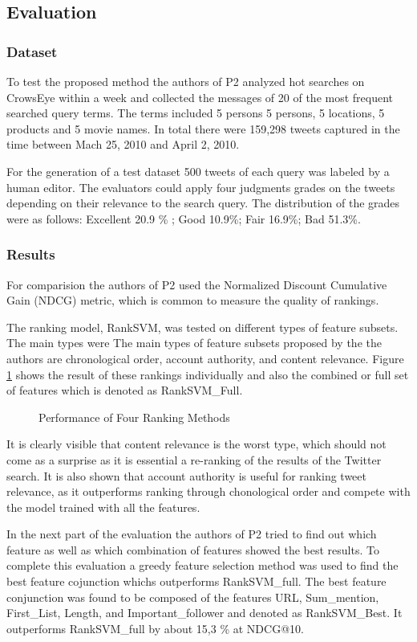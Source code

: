 \documentclass{proseminar}
\begin{document}
\subsection*{Evaluation}
\subsubsection*{Dataset}
To test the proposed method the authors of P2 analyzed hot searches on CrowsEye within a week and collected the messages of 20 of the most frequent searched query terms. The terms included 5 persons 5 persons, 5 locations, 5 products and 5 movie names. 
In total there were 159,298 tweets captured in the time between Mach 25, 2010 and April 2, 2010.

For the generation of a test dataset 500 tweets of each query was labeled by a human editor. The evaluators could apply four judgments grades on the tweets depending on their relevance to the search query. 
The distribution of the grades were as follows: Excellent 20.9 \% ; Good 10.9\%; Fair 16.9\%; Bad 51.3\%.


\subsubsection*{Results}
For comparision the authors of P2 used the Normalized Discount Cumulative Gain (NDCG) metric, which is common to measure the quality of rankings.

The ranking model, RankSVM, was tested on different types of feature subsets. The main types were 
The main types of feature subsets proposed by the the authors are chronological order, account authority, and content relevance. Figure \ref{fig:ranking} shows the result of these rankings individually and also the combined or full set of features which is denoted as RankSVM\_Full.

\begin{figure}[h]
\centering
{}
\caption{Performance of Four Ranking Methods}
\label{fig:ranking}
\end{figure}

It is clearly visible that content relevance is the worst type, which should not come as a surprise as it is essential a re-ranking of the results of the Twitter search. It is also shown that account authority is useful for ranking tweet relevance, as it outperforms ranking through chonological order and compete with the model trained with all the features.

In the next part of the evaluation the authors of P2 tried to find out which feature as well as which combination of features showed the best results.
To complete this evaluation a greedy feature selection method was used to find the best feature cojunction whichs outperforms RankSVM\_full. The best feature conjunction was found to be composed of the features URL, Sum\_mention, First\_List, Length, and Important\_follower and denoted as RankSVM\_Best. It outperforms RankSVM\_full by about 15,3 \% at NDCG@10.
\end{document}
